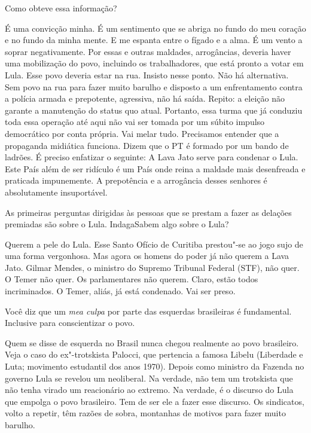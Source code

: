 \falaG Como obteve essa informação?

\falaM É uma convicção minha. É um sentimento que se abriga no fundo do meu
coração e no fundo da minha mente. E me espanta entre o fígado e a alma.
É um vento a soprar negativamente. Por essas e outras maldades,
arrogâncias, deveria haver uma mobilização do povo, incluindo os
trabalhadores, que está pronto a votar em Lula. Esse povo deveria estar
na rua. Insisto nesse ponto. Não há alternativa. Sem povo na rua para
fazer muito barulho e disposto a um enfrentamento contra a polícia
armada e prepotente, agressiva, não há saída. Repito: a eleição não
garante a manutenção do status quo atual. Portanto, essa turma que já
conduziu toda essa operação até aqui não vai ser tomada por um súbito
impulso democrático por conta própria. Vai melar tudo. Precisamos
entender que a propaganda midiática funciona. Dizem que o PT é formado
por um bando de ladrões. É preciso enfatizar o seguinte: A Lava Jato
serve para condenar o Lula. Este País além de ser ridículo é um País
onde reina a maldade mais desenfreada e praticada impunemente. A
prepotência e a arrogância desses senhores é absolutamente insuportável.

\falaG As primeiras perguntas dirigidas às pessoas que se prestam a fazer as
delações premiadas são sobre o Lula. Indaga\falaM Sabem algo sobre o Lula?

\falaM Querem a pele do Lula. Esse Santo Ofício de Curitiba prestou"-se ao
jogo sujo de uma forma vergonhosa. Mas agora os homens do poder já não
querem a Lava Jato. Gilmar Mendes, o ministro do Supremo Tribunal
Federal (STF), não quer. O Temer não quer. Os parlamentares não querem.
Claro, estão todos incriminados. O Temer, aliás, já está condenado. Vai
ser preso.

\falaG Você diz que um \emph{mea culpa} por parte das esquerdas brasileiras
é fundamental. Inclusive para conscientizar o povo.

\falaM Quem se disse de esquerda no Brasil nunca chegou realmente ao povo
brasileiro. Veja o caso do ex"-trotskista Palocci, que pertencia a famosa
Libelu (Liberdade e Luta; movimento estudantil dos anos 1970). Depois
como ministro da Fazenda no governo Lula se revelou um neoliberal. Na
verdade, não tem um trotskista que não tenha virado um reacionário ao
extremo. Na verdade, é o discurso do Lula que empolga o povo brasileiro.
Tem de ser ele a fazer esse discurso. Os sindicatos, volto a repetir,
têm razões de sobra, montanhas de motivos para fazer muito barulho.

